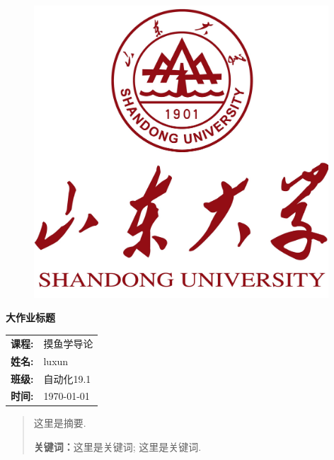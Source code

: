 \documentclass[12pt, a4paper, oneside]{ctexart}
\begin{document}
\thispagestyle{empty}

\begin{figure}[t]
    \centering
    \includegraphics[width=11cm]{logo3.png}
\end{figure}

\vspace*{\fill}
    \begin{center}
        \Huge\heiti{}\textbf{大作业标题}
    \end{center}
\vspace*{\fill}

\begin{table}[b]
    \centering
    \large
    \begin{tabular}{ll}
    \textbf{课程:} & 摸鱼学导论 \\
    \textbf{姓名:} & luxun \\
    \textbf{班级:} & 自动化19.1 \\
    \textbf{时间:} & \today \\
    \end{tabular}
\end{table}


\newpage

\thispagestyle{empty}
\begin{abstract}
    这里是摘要. 
    \par\textbf{关键词：}这里是关键词; 这里是关键词. 
\end{abstract}

\newpage
\thispagestyle{plain}
\setcounter{page}{1}
\tableofcontents
\end{document}

